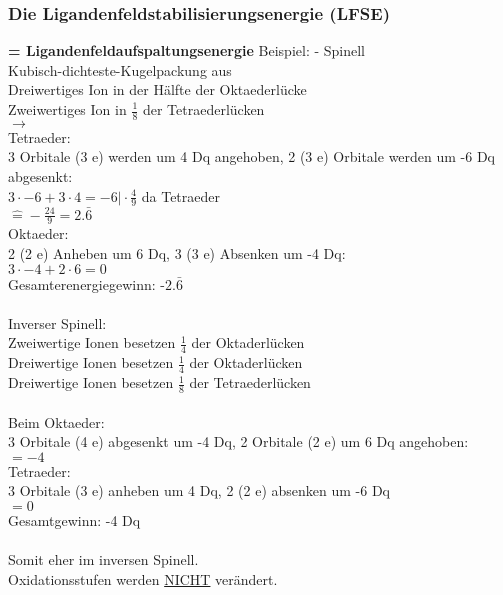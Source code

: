 \documentclass{article}
\begin{document}
\subsubsection{Die Ligandenfeldstabilisierungsenergie (LFSE)}
\textbf{= Ligandenfeldaufspaltungsenergie}
Beispiel:  - Spinell\\
Kubisch-dichteste-Kugelpackung aus \\
Dreiwertiges Ion in der Hälfte der Oktaederlücke\\
Zweiwertiges Ion in $\frac{1}{8}$ der Tetraederlücken\\
 $\rightarrow$ \\
Tetraeder:\\
3 Orbitale (3 e) werden um 4 Dq angehoben, 2 (3 e) Orbitale werden um -6 Dq abgesenkt:\\
$3\cdot -6 + 3 \cdot 4 = -6 \vert \cdot \frac{4}{9}$ da Tetraeder\\
$\hat{=} -\frac{24}{9} = 2.\bar{6}$\\
Oktaeder:\\
2 (2 e) Anheben um 6 Dq, 3 (3 e) Absenken um -4 Dq:\\
$3\cdot -4 + 2\cdot 6 = 0$\\
Gesamterenergiegewinn: -$2.\bar{6}$\\\\
Inverser Spinell:\\
Zweiwertige Ionen besetzen $\frac{1}{4}$ der Oktaderlücken\\
Dreiwertige Ionen besetzen $\frac{1}{4}$ der Oktaderlücken\\
Dreiwertige Ionen besetzen $\frac{1}{8}$ der Tetraederlücken\\\\
Beim Oktaeder:\\
3 Orbitale (4 e) abgesenkt um -4 Dq, 2 Orbitale (2 e) um 6 Dq angehoben:\\
$= -4$\\
Tetraeder:\\
3 Orbitale (3 e) anheben um 4 Dq, 2 (2 e) absenken um -6 Dq\\
$= 0$\\
Gesamtgewinn: -4 Dq\\\\
Somit eher im inversen Spinell.\\
Oxidationsstufen werden \underline{NICHT} verändert.
\end{document}
